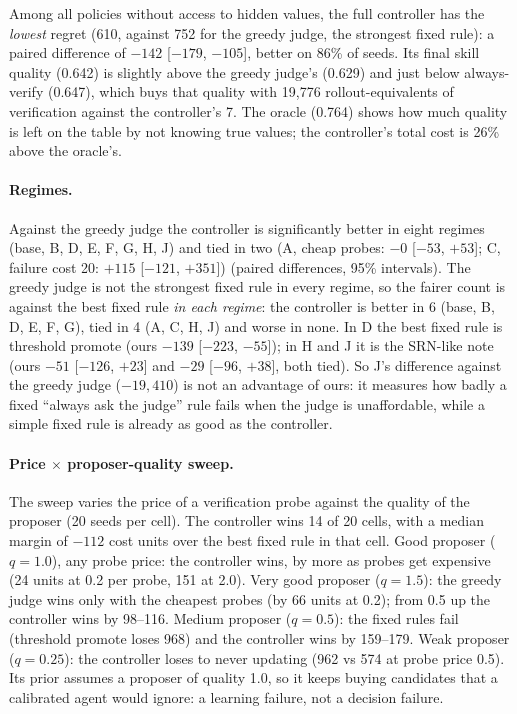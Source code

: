 \documentclass[11pt]{article}
\begin{document}
Among all policies without access to hidden values, the full controller has the
\emph{lowest} regret (610, against 752 for the greedy judge, the strongest fixed rule): a
paired difference of $-142$ [$-179$, $-105$], better on 86\% of seeds.  Its final skill
quality (0.642) is slightly above the greedy judge's (0.629) and just below always-verify
(0.647), which buys that quality with 19,776 rollout-equivalents of verification against the
controller's 7.  The oracle (0.764) shows how much quality is left on the table by not
knowing true values; the controller's total cost is 26\% above the oracle's.

\paragraph{Regimes.}
Against the greedy judge the controller is significantly better in eight regimes (base, B,
D, E, F, G, H, J) and tied in two (A, cheap probes: $-0$ [$-53$, $+53$]; C, failure cost
20: $+115$ [$-121$, $+351$]) (paired differences, 95\% intervals).  The greedy judge is not
the strongest fixed rule in every regime, so the fairer count is against the best fixed rule
\emph{in each regime}: the controller is better in 6 (base, B, D, E, F, G), tied in 4 (A, C,
H, J) and worse in none.  In D the best fixed rule is threshold promote (ours $-139$
[$-223$, $-55$]); in H and J it is the SRN-like note (ours $-51$ [$-126$, $+23$] and $-29$
[$-96$, $+38$], both tied).  So J's difference against the greedy judge ($-19{,}410$) is not
an advantage of ours: it measures how badly a fixed ``always ask the judge'' rule fails when
the judge is unaffordable, while a simple fixed rule is already as good as the controller.

\paragraph{Price $\times$ proposer-quality sweep.}
The sweep varies the price of a verification probe against the quality of the proposer
(20 seeds per cell).  The controller wins 14 of 20 cells, with a median margin of $-112$
cost units over the best fixed rule in that cell.  Good proposer ($q = 1.0$), any probe
price: the controller wins, by more as probes get expensive (24 units at 0.2 per probe, 151
at 2.0).  Very good proposer ($q = 1.5$): the greedy judge wins only with the cheapest probes
(by 66 units at 0.2); from 0.5 up the controller wins by 98--116.  Medium proposer ($q =
0.5$): the fixed rules fail (threshold promote loses 968) and the controller wins by
159--179.  Weak proposer ($q = 0.25$): the controller loses to never updating (962 vs 574 at
probe price 0.5).  Its prior assumes a proposer of quality 1.0, so it keeps buying candidates
that a calibrated agent would ignore: a learning failure, not a decision failure.
\end{document}
